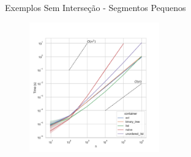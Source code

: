 \documentclass[aspectratio=169,usenames,dvipsnames]{beamer}
\begin{document}
\begin{frame}{Exemplos Sem Interseção - Segmentos Pequenos}
     \begin{figure}
        \includegraphics[width=0.5\textwidth]{figs/tempos/plot_small_detection_time.pdf}
      \end{figure}
\end{frame}
\end{document}
